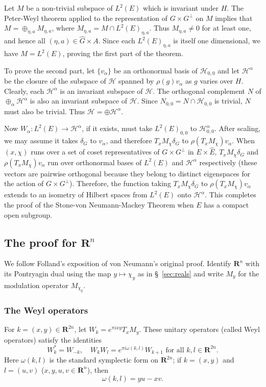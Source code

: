 \documentclass[11pt]{amsart}
\numberwithin{equation}{section}
\theoremstyle{plain}
\theoremstyle{definition}
\newcommand{\Hilb}{\mathcal H}
\newcommand{\R}{\mathbf R}
\begin{document}
Let $M$ be a non-trivial subspace of $L^2(E)$ which is invariant under $H$.
The Peter-Weyl theorem applied to the representation of $G\times G^\perp$ on $M$ implies that $M=\oplus_{\eta,a} M_{\eta,a}$, where $M_{\eta,a}=M\cap L^2(E)_{\eta,a}$.
Thus $M_{\eta,a}\neq 0$ for at least one, and hence all $(\eta,a)\in \hat G\times A$.
Since each $L^2(E)_{\eta,a}$ is itself one dimensional, we have $M=L^2(E)$, proving the first part of the theorem.

To prove the second part, let $\{v_\alpha\}$ be an orthonormal basis of $\Hilb_{0,0}$ and let $\Hilb^{\alpha}$ be the closure of the subspace of $\Hilb$ spanned by $\rho(g)v_\alpha$ as $g$ varies over $H$.
Clearly, each $\Hilb^\alpha$ is an invariant subspace of $\Hilb$.
The orthogonal complement $N$ of $\oplus_\alpha \Hilb^\alpha$ is also an invariant subspace of $\Hilb$.
Since $N_{0,0}=N\cap \Hilb_{0,0}$ is trivial, $N$ must also be trivial.
Thus $\Hilb=\oplus \Hilb^\alpha$.

Now $W_\alpha:L^2(E)\to \Hilb^\alpha$, if it exists, must take $L^2(E)_{0,0}$ to $\Hilb^\alpha_{0,0}$.
After scaling, we may assume it takes $\delta_G$ to $v_\alpha$, and therefore $T_x M_\chi \delta_G$ to $\rho(T_x M_\chi)v_\alpha$.
When $(x,\chi)$ runs over a set of coset representatives of $G\times G^\perp$ in $E\times \hat E$, $T_x M_\chi \delta_G$ and $\rho(T_x M_\chi) v_\alpha$ run over orthonormal bases of $L^2(E)$ and $\Hilb^\alpha$ respectively (these vectors are pairwise orthogonal because they belong to distinct eigenspaces for the action of $G\times G^\perp$).
Therefore, the function taking $T_x M_\chi \delta_G$ to $\rho(T_x M_\chi) v_\alpha$ extends to an isometry of Hilbert spaces from $L^2(E)$ onto $\Hilb^\alpha$.
This completes the proof of the Stone-von Neumann-Mackey Theorem when $E$ has a compact open subgroup.
\subsection{The proof for $\R^n$}
\label{sec:proof-Rn}
We follow Folland's exposition \cite{MR983366} of von Neumann's original proof.
Identify $\R^n$ with its Pontryagin dual using the map $y\mapsto \chi_y$ as in \S~\ref{sec:reals} and write $M_y$ for the modulation operator $M_{\chi_y}$.
\subsubsection*{The Weyl operators}
For $k=(x,y)\in \R^{2n}$, let $W_k=e^{\pi i x y}T_x M_y$.
These unitary operators (called Weyl operators) satisfy the identities
\begin{equation*}
  W_k^*=W_{-k},\quad W_kW_l=e^{\pi i \omega(k,l)}W_{k+1} \text{ for all } k,l\in \R^{2n}.
\end{equation*}
Here $\omega(k,l)$ is the standard symplectic form on $\R^{2n}$; if $k=(x,y)$ and $l=(u,v)$ ($x,y,u,v\in \R^n$), then
\begin{equation*}
  \omega(k,l)=y u-xv.
\end{equation*}
\end{document}
